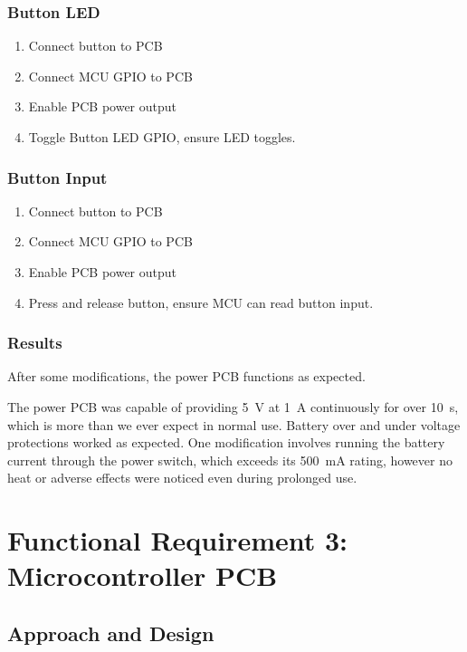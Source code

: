 \documentclass{notes}
\begin{document}
\subsubsection{Button LED}

\begin{enumerate}
    \item Connect button to PCB
    \item Connect MCU GPIO to PCB
    \item Enable PCB power output
    \item Toggle Button LED GPIO, ensure LED toggles.
\end{enumerate}

\subsubsection{Button Input}

\begin{enumerate}
    \item Connect button to PCB
    \item Connect MCU GPIO to PCB
    \item Enable PCB power output
    \item Press and release button, ensure MCU can read button input.
\end{enumerate}

\subsubsection{Results}

After some modifications\footnotemark, the power PCB functions as expected.

The power PCB was capable of providing \SI{5}{\volt} at \SI{1}{\ampere} continuously for over \SI{10}{\second}, which is more than we ever expect in normal use.
Battery over and under voltage protections worked as expected.
One modification involves running the battery current through the power switch, which exceeds its \SI{500}{\milli\ampere} rating, however no heat or adverse effects were noticed even during prolonged use.

\section{Functional Requirement 3: Microcontroller PCB}

\subsection{Approach and Design}
\end{document}
